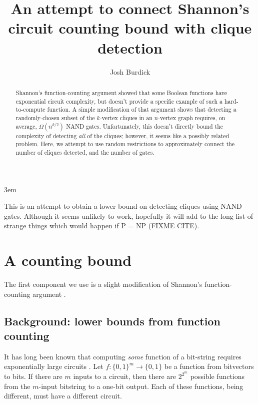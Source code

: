 \documentclass[12pt]{article}
\theoremstyle{definition}
\begin{document}
\emergencystretch 3em
\title{
An attempt to connect Shannon's
circuit counting bound with clique detection}

\author{Josh Burdick}


\begin{abstract}
Shannon's function-counting argument
\cite{shannon_synthesis_1949} showed that some Boolean functions have
exponential circuit complexity, but doesn't provide a specific example
of such a hard-to-compute function. A simple modification of that argument
shows that detecting a randomly-chosen subset of the $k$-vertex cliques in an
$n$-vertex graph requires, on average, $\Omega(n^{k/2})$ NAND gates.
Unfortunately,
this doesn't directly bound the complexity of detecting {\em all} of the cliques; however, it seems like a
possibly related problem.
Here, we attempt to use random restrictions to approximately
connect the number of cliques detected, and the number of gates.
\end{abstract}

\maketitle

\newpage

\tableofcontents

This is an attempt to obtain a lower bound on detecting cliques
using NAND gates. Although it seems unlikely to work, hopefully
it will add to the long list of strange things which would happen
if P = NP (FIXME CITE).

\section{A counting bound}
\label{countingBound}

The first component we use is a slight modification
of Shannon's function-counting argument
\cite{shannon_synthesis_1949}.

\subsection{Background: lower bounds from function counting}

It has long been known that computing {\em some} function of a bit-string
requires exponentially large circuits \cite{shannon_synthesis_1949}.
Let $f: \{0,1\}^m \rightarrow \{0,1\}$ be a function from bitvectors to bits.
If there are $m$ inputs to a circuit,
then there are $2^{2^m}$ possible functions from the $m$-input bitstring to
a one-bit output. Each of these functions, being different, must have a
different circuit.
\end{document}
